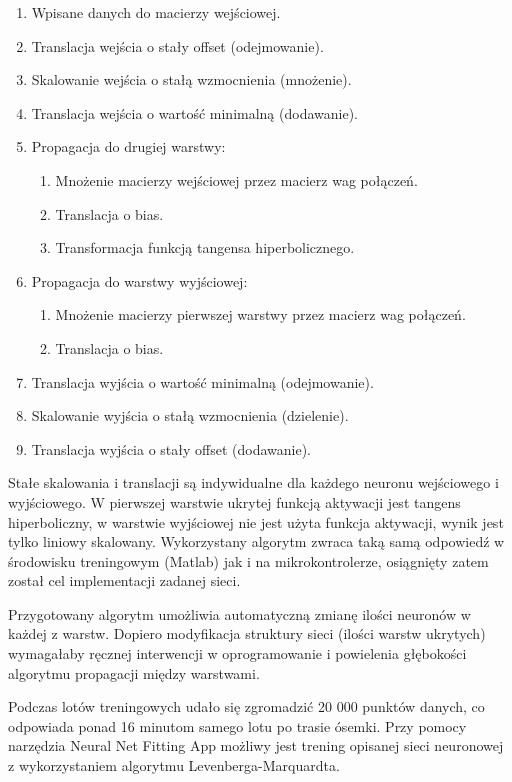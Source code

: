\documentclass[12pt, a4paper]{article}
\begin{document}
\begin{enumerate}
    \item Wpisane danych do macierzy wejściowej.
	\item Translacja wejścia o stały offset (odejmowanie).
	\item Skalowanie wejścia o stałą wzmocnienia (mnożenie).
	\item Translacja wejścia o wartość minimalną (dodawanie).
	\item Propagacja do drugiej warstwy:
	\begin{enumerate}
		\item Mnożenie macierzy wejściowej przez macierz wag połączeń.
		\item Translacja o bias.
		\item Transformacja funkcją tangensa hiperbolicznego.
	\end{enumerate}
	\item Propagacja do warstwy wyjściowej:
	\begin{enumerate}
		\item Mnożenie macierzy pierwszej warstwy przez macierz wag połączeń.
		\item Translacja o bias.
	\end{enumerate}
	\item Translacja wyjścia o wartość minimalną (odejmowanie).
	\item Skalowanie wyjścia o stałą wzmocnienia (dzielenie).
	\item Translacja wyjścia o stały offset (dodawanie).
\end{enumerate}

Stałe skalowania i translacji są indywidualne dla każdego neuronu wejściowego i wyjściowego. W pierwszej warstwie ukrytej funkcją aktywacji jest tangens hiperboliczny, w warstwie wyjściowej nie jest użyta funkcja aktywacji, wynik jest tylko liniowy skalowany. Wykorzystany algorytm zwraca taką samą odpowiedź w środowisku treningowym (Matlab) jak i na mikrokontrolerze, osiągnięty zatem został cel implementacji zadanej sieci.

Przygotowany algorytm umożliwia automatyczną zmianę ilości neuronów w każdej z warstw. Dopiero modyfikacja struktury sieci (ilości warstw ukrytych) wymagałaby ręcznej interwencji w oprogramowanie i powielenia głębokości algorytmu propagacji między warstwami.

Podczas lotów treningowych udało się zgromadzić 20 000 punktów danych, co odpowiada ponad 16 minutom samego lotu po trasie ósemki. Przy pomocy narzędzia Neural Net Fitting App możliwy jest trening opisanej sieci neuronowej z wykorzystaniem algorytmu Levenberga-Marquardta. 
\end{document}
